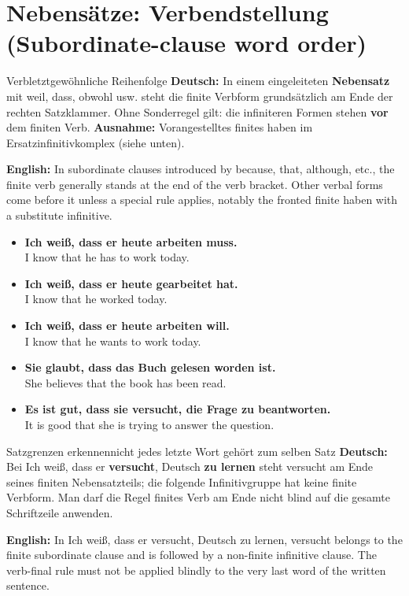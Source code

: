 \documentclass[a4paper,11pt]{article}
\newcommand{\GermanText}[1]{\textbf{Deutsch: }#1\par}
\newcommand{\EnglishText}[1]{{\small\color{SoftGray}\textbf{English: }#1\par}}
\newcommand{\ExampleItem}[2]{\item \textbf{#1}\\{\small\color{SoftGray}#2}}
\newcommand{\DEEN}[2]{\GermanText{#1}\EnglishText{#2}}
\newcommand{\Pair}[2]{\ExampleItem{#1}{#2}}
\begin{document}
\section{Nebensätze: Verbendstellung \textnormal{(Subordinate-clause word order)}}
\begin{grammarentry}{Verbletzt}{gewöhnliche Reihenfolge}
\DEEN{In einem eingeleiteten \textbf{Nebensatz} mit weil, dass, obwohl usw. steht die finite Verbform grundsätzlich am Ende der rechten Satzklammer. Ohne Sonderregel gilt: die infiniteren Formen stehen \textbf{vor} dem finiten Verb. \textbf{Ausnahme:} Vorangestelltes finites haben im Ersatzinfinitivkomplex (siehe unten).}{In subordinate clauses introduced by because, that, although, etc., the finite verb generally stands at the end of the verb bracket. Other verbal forms come before it unless a special rule applies, notably the fronted finite haben with a substitute infinitive.}
\end{grammarentry}
\begin{exbox}\begin{itemize}
\Pair{Ich weiß, dass er heute arbeiten muss.}{I know that he has to work today.}
\Pair{Ich weiß, dass er heute gearbeitet hat.}{I know that he worked today.}
\Pair{Ich weiß, dass er heute arbeiten will.}{I know that he wants to work today.}
\Pair{Sie glaubt, dass das Buch gelesen worden ist.}{She believes that the book has been read.}
\Pair{Es ist gut, dass sie versucht, die Frage zu beantworten.}{It is good that she is trying to answer the question.}
\end{itemize}\end{exbox}
\begin{grammarentry}{Satzgrenzen erkennen}{nicht jedes letzte Wort gehört zum selben Satz}
\DEEN{Bei \glqq Ich weiß, dass er \textbf{versucht}, Deutsch \textbf{zu lernen}\grqq{} steht versucht am Ende seines finiten Nebensatzteils; die folgende Infinitivgruppe hat keine finite Verbform. Man darf die Regel \glqq finites Verb am Ende\grqq{} nicht blind auf die gesamte Schriftzeile anwenden.}{In Ich weiß, dass er versucht, Deutsch zu lernen, versucht belongs to the finite subordinate clause and is followed by a non-finite infinitive clause. The verb-final rule must not be applied blindly to the very last word of the written sentence.}
\end{grammarentry}
\end{document}
